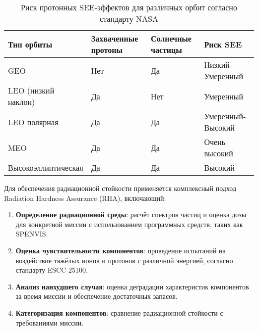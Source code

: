 \begin{table}[H]
	\centering
	\small
	\renewcommand{\arraystretch}{1.5}
	\begin{tabular}{|p{4.5cm}|p{3cm}|p{3.5cm}|p{4cm}|}
		\hline
		\textbf{Тип орбиты} & \textbf{Захваченные протоны} & \textbf{Солнечные частицы} & \textbf{Риск SEE} \\
		\hline
		GEO                 & Нет                          & Да                         & Низкий-Умеренный  \\
		\hline
		LEO (низкий наклон) & Да                           & Нет                        & Умеренный         \\
		\hline
		LEO полярная        & Да                           & Да                         & Умеренный-Высокий \\
		\hline
		MEO                 & Да                           & Да                         & Очень высокий     \\
		\hline
		Высокоэллиптическая & Да                           & Да                         & Высокий           \\
		\hline
	\end{tabular}
	\caption{Риск протонных SEE-эффектов для различных орбит согласно стандарту
		NASA \cite{proton_guide}}
	\label{tab:radiation_risk_orbits}
\end{table}



Для обеспечения радиационной стойкости применяется комплексный подход Radiation Hardness Assurance (RHA), включающий:

\begin{enumerate}
	\item \textbf{Определение радиационной среды}: расчёт спектров частиц и оценка дозы для конкретной миссии с использованием программных средств, таких как SPENVIS\cite{nasa_rha_standard}.

	\item \textbf{Оценка чувствительности компонентов}: проведение испытаний на воздействие тяжёлых ионов и протонов с различной энергией, согласно стандарту ESCC 25100\cite{escc_see_test}.

	\item \textbf{Анализ наихудшего случая}: оценка деградации характеристик компонентов за время миссии и обеспечение достаточных запасов\cite{nasa_rha_standard}.

	\item \textbf{Категоризация компонентов}: сравнение радиационной стойкости с требованиями миссии\cite{rha_space_systems}.
\end{enumerate}

